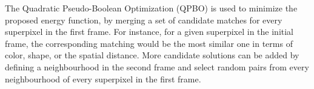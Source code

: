 
The Quadratic Pseudo-Boolean Optimization (QPBO) \cite{c3}\cite{c4} is used to minimize the proposed energy function, 
by merging a set of candidate matches for every superpixel in the first frame.
For instance, for a given superpixel in the initial frame, the corresponding 
matching would be the most similar one in terms of color, shape, or the spatial distance. More candidate solutions can be added by defining a
neighbourhood in the second frame and select random pairs from every neighbourhood of every superpixel
in the first frame. %


